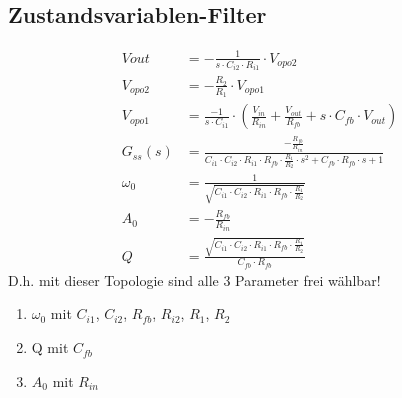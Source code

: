\subsection{Zustandsvariablen-Filter}
\begin{align*}
	V{out}		&=-\frac{1}{s\cdot C_{i2}\cdot R_{i1}}\cdot V_{opo2}\\
	V_{opo2}	&=-\frac{R_2}{R_1}\cdot V_{opo1}\\
	V_{opo1}	&=\frac{-1}{s\cdot C_{i1}}\cdot (\frac{V_{in}}{R_{in}}+\frac{V_{out}}{R_{fb}}+s\cdot C_{fb}\cdot V_{out})\\
	G_{ss}(s)	&=\frac{-\frac{R_{fb}}{R_{in}}}{C_{i1}\cdot C_{i2}\cdot R_{i1}\cdot R_{fb}\cdot \frac{R_1}{R_2}\cdot s^2+C_{fb}\cdot R_{fb}\cdot s+1}\\
	\omega_{0}	&=\frac{1}{\sqrt{C_{i1}\cdot C_{i2}\cdot R_{i1}\cdot R_{fb}\cdot \frac{R_1}{R_2}}}\\
	A_{0}		&=-\frac{R_{fb}}{R_{in}}\\
	Q			&=\frac{\sqrt{C_{i1}\cdot C_{i2}\cdot R_{i1}\cdot R_{fb}\cdot \frac{R_1}{R_2}}}{C_{fb}\cdot R_{fb}}
\end{align*}
D.h. mit dieser Topologie sind alle 3 Parameter frei wählbar!
\begin{enumerate}
  \item $\omega_{0}$ mit $C_{i1}$, $C_{i2}$, $R_{fb}$, $R_{i2}$, $R_1$, $R_2$
  \item Q mit $C_{fb}$
  \item $A_0$ mit $R_{in}$
\end{enumerate}


